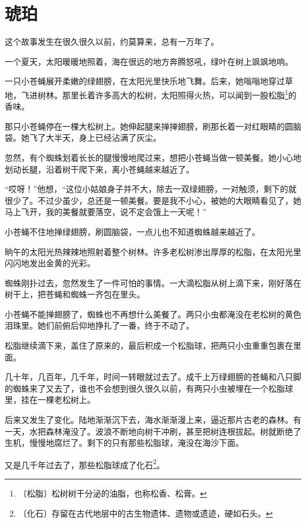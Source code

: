 \documentclass[12pt,UTF-8,openany]{ctexbook}
\begin{document}
\chapter{琥珀}

\begin{Large}
    
    这个故事发生在很久很久以前，约莫算来，总有一万年了。
    
    一个夏天，太阳暖暖地照着，海在很远的地方奔腾怒吼，绿叶在树上飒飒地响。
    
    一只小苍蝇展开柔嫩的绿翅膀，在太阳光里快乐地飞舞。后来，她嗡嗡地穿过草地，飞进树林。那里长着许多高大的松树，太阳照得火热，可以闻到一股松脂\footnote{〔松脂〕松树树干分泌的油脂，也称松香、松膏。}的香味。
    
    那只小苍蝇停在一棵大松树上。她伸起腿来掸掸翅膀，刷那长着一对红眼睛的圆脑袋。她飞了大半天，身上已经沾满了灰尘。
    
    忽然，有个蜘蛛划着长长的腿慢慢地爬过来，想把小苍蝇当做一顿美餐。她小心地划动长腿，沿着树干爬下来，离小苍蝇越来越近了。
    
    “哎呀！”他想，“这位小姑娘身子并不大，除去一双绿翅膀，一对触须，剩下的就很少了。不过少虽少，总还是一顿美餐。要是我不小心，被她的大眼睛看见了，她马上飞开，我的美餐就要落空，说不定会饿上一天呢！”
    
    小苍蝇不住地掸绿翅膀，刷圆脑袋，一点儿也不知道蜘蛛越来越近了。
    
    晌午的太阳光热辣辣地照射着整个树林。许多老松树渗出厚厚的松脂，在太阳光里闪闪地发出金黄的光彩。
    
    蜘蛛刚扑过去，忽然发生了一件可怕的事情。一大滴松脂从树上滴下来，刚好落在树干上，把苍蝇和蜘蛛一齐包在里头。
    
    小苍蝇不能掸翅膀了，蜘蛛也不再想什么美餐了。两只小虫都淹没在老松树的黄色泪珠里。她们前俯后仰地挣扎了一番，终于不动了。
    
    松脂继续滴下来，盖住了原来的，最后积成一个松脂球，把两只小虫重重包裹在里面。
    
    几十年，几百年，几千年，时间一转眼就过去了。成千上万绿翅膀的苍蝇和八只脚的蜘蛛来了又去了，谁也不会想到很久很久以前，有两只小虫被埋在一个松脂球里，挂在一棵老松树上。
    
    后来又发生了变化。陆地渐渐沉下去，海水渐渐漫上来，逼近那片古老的森林。有一天，水把森林淹没了。波浪不断地向树干冲刷，甚至把树连根拔起。树就断绝了生机，慢慢地腐烂了。剩下的只有那些松脂球，淹没在海沙下面。
    
    又是几千年过去了，那些松脂球成了化石\footnote{〔化石〕存留在古代地层中的古生物遗体、遗物或遗迹，硬如石头。}。
    

\end{Large}
\end{document}
